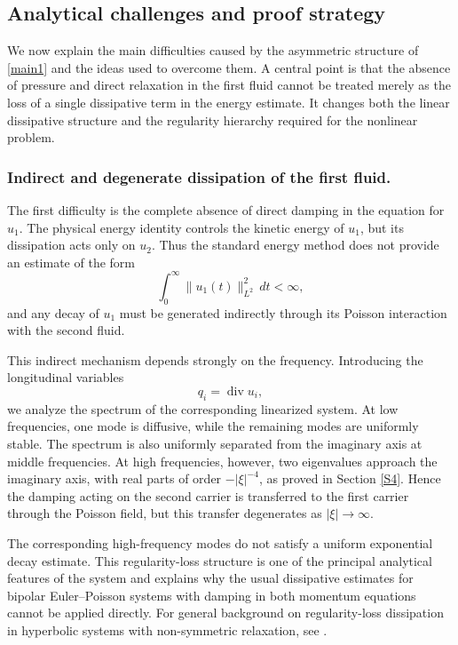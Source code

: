 \documentclass[10pt,reqno]{amsart}
\numberwithin{equation}{section}
\begin{document}
\subsection{Analytical challenges and proof strategy}

We now explain the main difficulties caused by the asymmetric structure of \eqref{main1} and the ideas used to overcome them. A central point is that the absence of pressure and direct relaxation in the first fluid cannot be treated merely as the loss of a single dissipative term in the energy estimate. It changes both the linear dissipative structure and the regularity hierarchy required for the nonlinear problem.


%
%
%
%
%
%
\subsubsection*{Indirect and degenerate dissipation of the first fluid.}

The first difficulty is the complete absence of direct damping in the equation for $u_1$. The physical energy identity controls the kinetic energy of $u_1$, but its dissipation acts only on $u_2$. Thus the standard energy method does not provide an estimate of the form
\[
\int_0^\infty \|u_1(t)\|_{L^2}^2\,dt<\infty,
\]
and any decay of $u_1$ must be generated indirectly through its Poisson interaction with the second fluid.

This indirect mechanism depends strongly on the frequency. Introducing the longitudinal variables
\[
q_i=\operatorname{div}u_i,
\]
we analyze the spectrum of the corresponding linearized system. At low frequencies, one mode is diffusive, while the remaining modes are uniformly stable. The spectrum is also uniformly separated from the imaginary axis at middle frequencies. At high frequencies, however, two eigenvalues approach the imaginary axis, with real parts of order $-|\xi|^{-4}$, as proved in Section \ref{S4}. Hence the damping acting on the second carrier is transferred to the first carrier through the Poisson field, but this transfer degenerates as $|\xi|\to\infty$.

The corresponding high-frequency modes do not satisfy a uniform exponential decay estimate. This regularity-loss structure is one of the principal analytical features of the system and explains why the usual dissipative estimates for bipolar Euler--Poisson systems with damping in both momentum equations cannot be applied directly. For general background on regularity-loss dissipation in hyperbolic systems with non-symmetric relaxation, see \cite{UDK12}.
\end{document}
